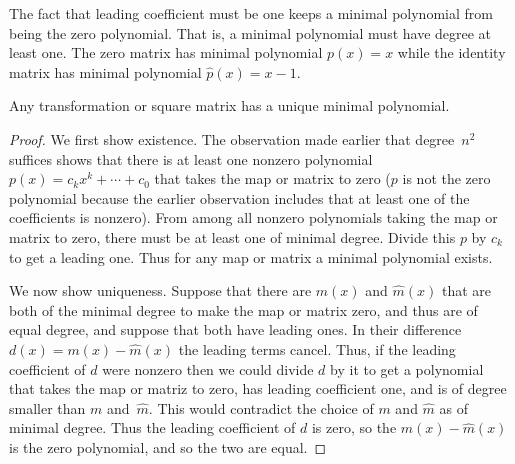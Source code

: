 \noindent The fact that leading coefficient must be one keeps a minimal
polynomial from being the zero polynomial.
That is, a minimal polynomial must have degree at least one.
The zero matrix has minimal polynomial $p(x)=x$ while the 
identity matrix has minimal polynomial $\hat{p}(x)=x-1$.

\begin{lemma}
Any transformation or square matrix has a unique minimal polynomial.  
\end{lemma}

\begin{proof}
We first show existence.
The observation made earlier
that degree~$n^2$ suffices shows that there is at least one 
nonzero polynomial $p(x)=c_kx^k+\cdots+c_0$ that
takes the map or matrix to zero
($p$ is not the zero polynomial because the earlier observation includes that
at least one of the coefficients is nonzero).
From among all nonzero polynomials taking the map or matrix to zero, 
there must be at least one of minimal degree.
Divide this $p$ by $c_k$ to get a leading one.
Thus for any map or matrix a minimal polynomial exists.

We now show uniqueness.
Suppose that 
there are \( m(x) \) and \( \hat{m}(x) \) that are both of the 
minimal degree to make the map or matrix zero, and thus are of equal degree, 
and suppose that both have leading ones.
In their difference \( d(x)=m(x)-\hat{m}(x) \) the leading terms cancel.
Thus, 
if the leading coefficient of $d$ were nonzero then we could divide
$d$ by it to get a polynomial that takes the map or matriz to zero,
has leading coefficient one, and is of degree smaller than 
$m$ and~$\hat{m}$.
This would contradict the choice of $m$ and $\hat{m}$ as of minimal degree. 
Thus the leading coefficient of $d$ is zero,
so the \( m(x)-\hat{m}(x) \) is the zero polynomial, 
and so the two are equal.
\end{proof}


